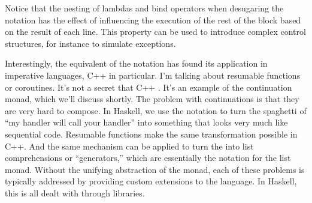 Notice that the nesting of lambdas and bind operators when desugaring
the  notation has the effect of influencing the execution of
the rest of the  block based on the result of each line. This
property can be used to introduce complex control structures, for
instance to simulate exceptions.

Interestingly, the equivalent of the  notation has found its
application in imperative languages, C++ in particular. I'm talking
about resumable functions or coroutines. It's not a secret that C++
. It's an example of the continuation monad, which we'll
discuss shortly. The problem with continuations is that they are very
hard to compose. In Haskell, we use the  notation to turn the
spaghetti of ``my handler will call your handler'' into something that
looks very much like sequential code. Resumable functions make the same
transformation possible in C++. And the same mechanism can be applied to
turn the
 into list comprehensions or ``generators,'' which are
essentially the  notation for the list monad. Without the
unifying abstraction of the monad, each of these problems is typically
addressed by providing custom extensions to the language. In Haskell,
this is all dealt with through libraries.
